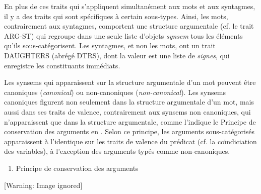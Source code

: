 En plus de ces traits qui s'appliquent simultanément aux mots et aux syntagmes, il y a des traits qui sont spécifiques à certain sous-types. Ainsi, les mots, contrairement aux syntagmes, comportent une structure argumentale (cf. le trait ARG-ST) qui regroupe dans une seule liste d'objets \textit{synsem} tous les éléments qu'ils sous-catégorisent. Les syntagmes, et non les mots, ont un trait DAUGHTERS (abrégé DTRS), dont la valeur est une liste de \textit{signes}, qui enregistre les constituants immédiats. 

Les synsems qui apparaissent sur la structure argumentale d'un mot peuvent être canoniques (\textit{canonical}) ou non-canoniques (\textit{non-canonical}). Les synsems canoniques figurent non seulement dans la structure argumentale d'un mot, mais aussi dans ses traits de valence, contrairement aux synsems non canoniques, qui n'apparaissent que dans la structure argumentale, comme l'indique le Principe de conservation des arguments en . Selon ce principe, les arguments sous-catégorisés apparaissent à l'identique sur les traits de valence du prédicat (cf. la coïndiciation des variables), à l'exception des arguments typés comme non-canoniques. 


\begin{enumerate}
\item \label{bkm:Ref290386869}Principe de conservation des arguments


\end{enumerate}
  [Warning: Image ignored] %
 


